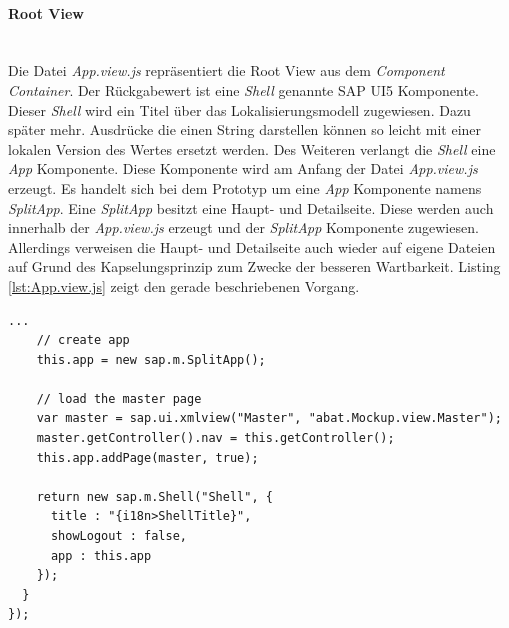 \paragraph{Root View}$\;$ \\
Die Datei \textit{App.view.js} repräsentiert die Root View aus dem \textit{Component Container}. Der Rückgabewert ist eine \textit{Shell} genannte SAP UI5 Komponente. Dieser \textit{Shell} wird ein Titel über das Lokalisierungsmodell zugewiesen. Dazu später mehr. Ausdrücke die einen String darstellen können so leicht mit einer lokalen Version des Wertes ersetzt werden. Des Weiteren verlangt die \textit{Shell} eine \textit{App} Komponente. Diese Komponente wird am Anfang der Datei \textit{App.view.js} erzeugt. Es handelt sich bei dem Prototyp um eine \textit{App} Komponente namens \textit{SplitApp}. Eine \textit{SplitApp} besitzt eine Haupt- und Detailseite. Diese werden auch innerhalb der \textit{App.view.js} erzeugt und der \textit{SplitApp} Komponente zugewiesen. Allerdings verweisen die Haupt- und Detailseite auch wieder auf eigene Dateien auf Grund des Kapselungsprinzip zum Zwecke der besseren Wartbarkeit. Listing \ref{lst:App.view.js} zeigt den gerade beschriebenen Vorgang.

\vspace{1em}
\begin{lstlisting}[frame=htrbl, caption=Root View der Applikation, label=lst:App.view.js]
...
    // create app
    this.app = new sap.m.SplitApp();

    // load the master page
    var master = sap.ui.xmlview("Master", "abat.Mockup.view.Master");
    master.getController().nav = this.getController();
    this.app.addPage(master, true);

    return new sap.m.Shell("Shell", {
      title : "{i18n>ShellTitle}",
      showLogout : false,
      app : this.app
    });
  }
});
\end{lstlisting}
	
